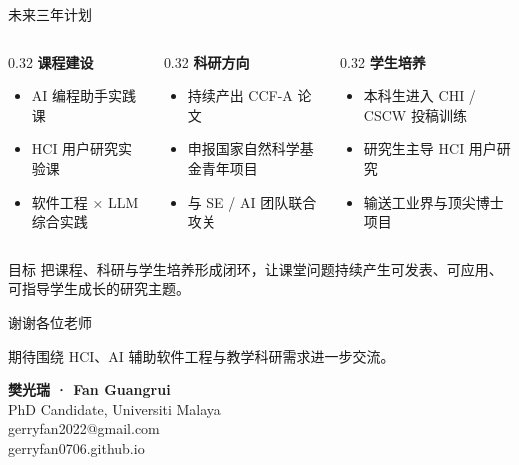 \documentclass{beamer}
\newcommand{\tightitems}{\setlength\itemsep{2pt}}
\begin{document}
\begin{frame}{未来三年计划}
\small
\begin{columns}[T]
\begin{column}{0.32\textwidth}
\textbf{\textcolor{maincolor}{课程建设}}
\begin{itemize}\tightitems
  \item AI 编程助手实践课
  \item HCI 用户研究实验课
  \item 软件工程 × LLM 综合实践
\end{itemize}
\end{column}
\begin{column}{0.32\textwidth}
\textbf{\textcolor{maincolor}{科研方向}}
\begin{itemize}\tightitems
  \item 持续产出 CCF-A 论文
  \item 申报国家自然科学基金青年项目
  \item 与 SE / AI 团队联合攻关
\end{itemize}
\end{column}
\begin{column}{0.32\textwidth}
\textbf{\textcolor{maincolor}{学生培养}}
\begin{itemize}\tightitems
  \item 本科生进入 CHI / CSCW 投稿训练
  \item 研究生主导 HCI 用户研究
  \item 输送工业界与顶尖博士项目
\end{itemize}
\end{column}
\end{columns}
\vspace{4mm}
\begin{block}{目标}
把课程、科研与学生培养形成闭环，让课堂问题持续产生可发表、可应用、可指导学生成长的研究主题。
\end{block}
\end{frame}

\begin{frame}{谢谢各位老师}
\begin{center}
{\Large 期待围绕 HCI、AI 辅助软件工程与教学科研需求进一步交流。}

\vspace{10mm}
\textbf{樊光瑞 · Fan Guangrui}\\
PhD Candidate, Universiti Malaya\\
gerryfan2022@gmail.com\\
gerryfan0706.github.io
\end{center}
\end{frame}
\end{document}
